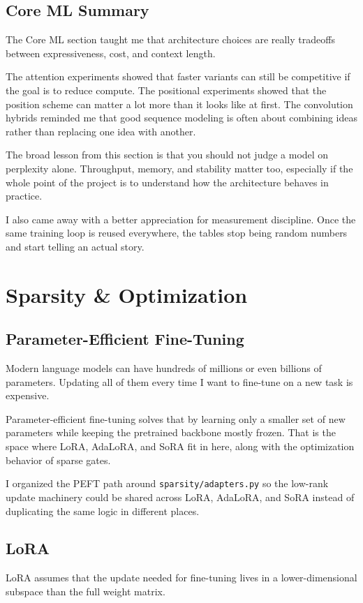 \documentclass[11pt]{article}
\begin{document}
\subsection{Core ML Summary}
The Core ML section taught me that architecture choices are really tradeoffs between expressiveness, cost, and context length.

The attention experiments showed that faster variants can still be competitive if the goal is to reduce compute.
The positional experiments showed that the position scheme can matter a lot more than it looks like at first.
The convolution hybrids reminded me that good sequence modeling is often about combining ideas rather than replacing one idea with another.

The broad lesson from this section is that you should not judge a model on perplexity alone. Throughput, memory, and stability matter too, especially if the whole point of the project is to understand how the architecture behaves in practice.

I also came away with a better appreciation for measurement discipline. Once the same training loop is reused everywhere, the tables stop being random numbers and start telling an actual story.

\section{Sparsity \& Optimization}
\subsection{Parameter-Efficient Fine-Tuning}
Modern language models can have hundreds of millions or even billions of parameters. Updating all of them every time I want to fine-tune on a new task is expensive.

Parameter-efficient fine-tuning solves that by learning only a smaller set of new parameters while keeping the pretrained backbone mostly frozen. That is the space where LoRA, AdaLoRA, and SoRA fit in here, along with the optimization behavior of sparse gates.

I organized the PEFT path around \texttt{sparsity/adapters.py} so the low-rank update machinery could be shared across LoRA, AdaLoRA, and SoRA instead of duplicating the same logic in different places.

\subsection{LoRA}
LoRA assumes that the update needed for fine-tuning lives in a lower-dimensional subspace than the full weight matrix.
\end{document}
